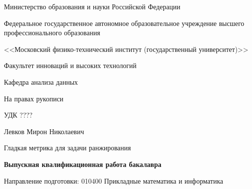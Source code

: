 \documentclass[12pt,a4paper]{amsart}
\theoremstyle{definition}
\theoremstyle{definition}
\begin{document}
\begin{titlepage}

\begin{center}
Министерство образования и науки Российской Федерации
\vspace{0.4cm}

Федеральное государственное автономное образовательное учреждение высшего профессионального образования
\vspace{0.4cm}

<<Московский физико-технический институт (государственный университет)>>
\vspace{0.4cm}

Факультет инноваций и высоких технологий
\vspace{0.4cm}

Кафедра анализа данных
\vspace{0.7cm}

\end{center}

\begin{flushright}
  На правах рукописи

  УДК ????\phantom{}
\end{flushright}

\vspace{1.4cm}

\begin{center}
Левков Мирон Николаевич
\end{center}

\vspace{0.8cm}

\begin{center}
Гладкая метрика для задачи ранжирования
\end{center}

\vspace{1.3cm}

\begin{center}
\bf Выпускная квалификационная работа бакалавра
\end{center}

\vspace{1.8cm}

\begin{center}
Направление подготовки: 010400 Прикладные математика и информатика
\end{center}

\vspace{0.8cm}


\vspace{2.0cm}


\end{titlepage}
\end{document}
